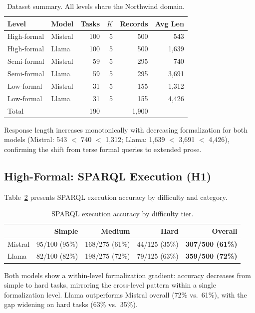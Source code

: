 \documentclass[runningheads]{llncs}
\begin{document}
\begin{table}[h]
\centering
\caption{Dataset summary. All levels share the Northwind domain.}
\label{tab:dataset}
\begin{tabular}{llrrrr}
\toprule
Level & Model & Tasks & $K$ & Records & Avg Len \\
\midrule
High-formal & Mistral   & 100 & 5 & 500 & 543 \\
High-formal & Llama     & 100 & 5 & 500 & 1{,}639 \\
Semi-formal & Mistral   &  59 & 5 & 295 & 740 \\
Semi-formal & Llama     &  59 & 5 & 295 & 3{,}691 \\
Low-formal  & Mistral   &  31 & 5 & 155 & 1{,}312 \\
Low-formal  & Llama     &  31 & 5 & 155 & 4{,}426 \\
\midrule
\multicolumn{2}{l}{Total} & 190 & & 1{,}900 & \\
\bottomrule
\end{tabular}
\end{table}

Response length increases monotonically with decreasing formalization for both models (Mistral: 543 $<$ 740 $<$ 1{,}312; Llama: 1{,}639 $<$ 3{,}691 $<$ 4{,}426), confirming the shift from terse formal queries to extended prose.

\subsection{High-Formal: SPARQL Execution (H1)}

Table~\ref{tab:sparql} presents SPARQL execution accuracy by difficulty and category.

\begin{table}[h]
\centering
\caption{SPARQL execution accuracy by difficulty tier.}
\label{tab:sparql}
\begin{tabular}{lrrrr}
\toprule
& Simple & Medium & Hard & \textbf{Overall} \\
\midrule
Mistral & 95/100 (95\%) & 168/275 (61\%) & 44/125 (35\%) & \textbf{307/500 (61\%)} \\
Llama   & 82/100 (82\%) & 198/275 (72\%) & 79/125 (63\%) & \textbf{359/500 (72\%)} \\
\bottomrule
\end{tabular}
\end{table}

Both models show a within-level formalization gradient: accuracy decreases from simple to hard tasks, mirroring the cross-level pattern within a single formalization level. Llama outperforms Mistral overall (72\% vs.\ 61\%), with the gap widening on hard tasks (63\% vs.\ 35\%).
\end{document}

